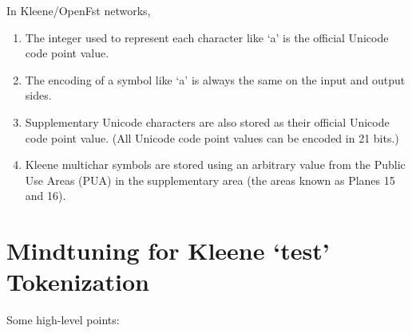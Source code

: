 \documentclass[letterpaper,12pt]{article}
\begin{document}
In Kleene/OpenFst networks,

\begin{enumerate}
\item
The integer used to represent each character like `a' is the official
Unicode code point value.  
\item
The encoding of a symbol like `a' is always the same on the input and output
sides.
\item
Supplementary Unicode characters are also stored as their official Unicode
code point value.  (All Unicode code point values can be encoded in 21
bits.)
\item
Kleene multichar symbols are stored using an arbitrary value from the
Public Use Areas (PUA) in the supplementary area (the areas known as
Planes 15 and 16).
\end{enumerate}

\section{Mindtuning for Kleene `test' Tokenization}

Some high-level points:
\end{document}
